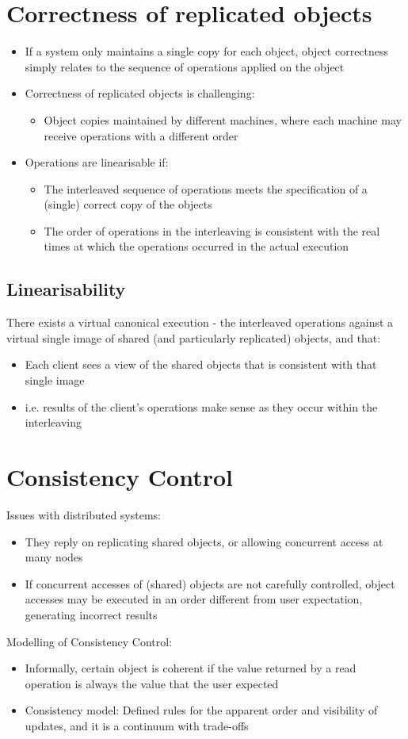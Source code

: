 \documentclass{article}[18pt]
\begin{document}
\section{Correctness of replicated objects}
\begin{itemize}
	\item If a system only maintains a single copy for each object, object correctness simply relates to the sequence of operations applied on the object
	\item Correctness of replicated objects is challenging:
	\begin{itemize}
		\item Object copies maintained by different machines, where each machine may receive operations with a different order
	\end{itemize}
	\item Operations are linearisable if:
	\begin{itemize}
		\item The interleaved sequence of operations meets the specification of a (single) correct copy of the objects
		\item The order of operations in the interleaving is consistent with the real times at which the operations occurred in the actual execution
	\end{itemize}
\end{itemize}
\subsection{Linearisability}
There exists a virtual canonical execution - the interleaved operations against a virtual single image of shared (and particularly replicated) objects, and that:
\begin{itemize}
	\item Each client sees a view of the shared objects that is consistent with that single image
	\item i.e. results of the client's operations make sense as they occur within the interleaving
\end{itemize}
\section{Consistency Control}
Issues with distributed systems:
\begin{itemize}
	\item They reply on replicating shared objects, or allowing concurrent access at many nodes
	\item If concurrent accesses of (shared) objects are not carefully controlled, object accesses may be executed in an order different from user expectation, generating incorrect results
\end{itemize}
Modelling of Consistency Control:
\begin{itemize}
	\item Informally, certain object is coherent if the value returned by a read operation is always the value that the user expected
	\item Consistency model: Defined rules for the apparent order and visibility of updates, and it is a continuum with trade-offs
\end{itemize}
\end{document}
